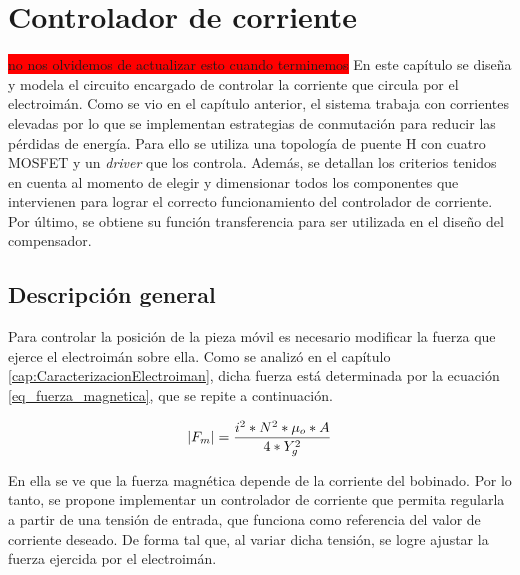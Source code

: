 \chapter{Controlador de corriente}  \label{cap:ControladorCorriente}
\colorbox{red}{no nos olvidemos de actualizar esto cuando terminemos}
En este capítulo se diseña y modela el circuito encargado de controlar la corriente que circula por el electroimán. Como se vio en el capítulo anterior, el sistema trabaja con corrientes elevadas por lo que se implementan estrategias de conmutación para reducir las pérdidas de energía. Para ello se utiliza una topología de puente H con cuatro MOSFET y un \textsl{driver} que los controla. Además, se detallan los criterios tenidos en cuenta al momento de  elegir  y dimensionar todos los componentes que intervienen para lograr el correcto funcionamiento del controlador de corriente. Por último, se obtiene su función transferencia  para ser utilizada en el diseño del compensador.

\section{Descripción general}\label{sec_descripcion-general}

Para controlar la posición de la pieza móvil es necesario modificar la fuerza que ejerce el electroimán sobre ella. Como se analizó en el capítulo \ref{cap:CaracterizacionElectroiman}, dicha fuerza está determinada por la ecuación \ref{eq_fuerza_magnetica}, que se repite a continuación. 

\begin{equation*}
	\lvert F_{m}\rvert=\frac{i^{2}*N^{2}*\mu_{o}*A}{4*Y_{g}^{2}}
\end{equation*}

En ella se ve que la fuerza magnética depende de la corriente del bobinado. Por lo tanto, se propone implementar un controlador de corriente que permita regularla a partir de una tensión de entrada, que funciona como referencia del valor de corriente deseado. De forma tal que, al variar dicha tensión, se logre ajustar la fuerza ejercida por el electroimán.


